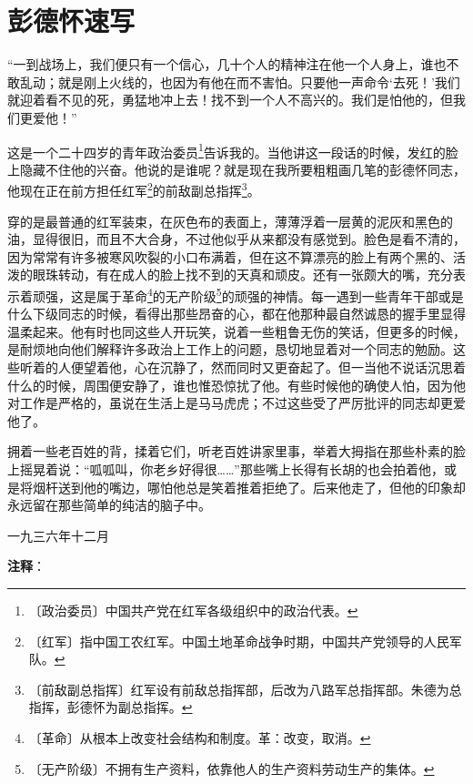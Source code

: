 \documentclass[12pt,UTF-8,openany]{ctexbook}
\begin{document}
\chapter{彭德怀速写}

\begin{Large}
    
    “一到战场上，我们便只有一个信心，几十个人的精神注在他一个人身上，谁也不敢乱动；就是刚上火线的，也因为有他在而不害怕。只要他一声命令‘去死！’我们就迎着看不见的死，勇猛地冲上去！找不到一个人不高兴的。我们是怕他的，但我们更爱他！”
    
    这是一个二十四岁的青年政治委员\footnote{〔政治委员〕中国共产党在红军各级组织中的政治代表。}告诉我的。当他讲这一段话的时候，发红的脸上隐藏不住他的兴奋。他说的是谁呢？就是现在我所要粗粗画几笔的彭德怀同志，他现在正在前方担任红军\footnote{〔红军〕指中国工农红军。中国土地革命战争时期，中国共产党领导的人民军队。}的前敌副总指挥\footnote{〔前敌副总指挥〕红军设有前敌总指挥部，后改为八路军总指挥部。朱德为总指挥，彭德怀为副总指挥。}。
    
    穿的是最普通的红军装束，在灰色布的表面上，薄薄浮着一层黄的泥灰和黑色的油，显得很旧，而且不大合身，不过他似乎从来都没有感觉到。脸色是看不清的，因为常常有许多被寒风吹裂的小口布满着，但在这不算漂亮的脸上有两个黑的、活泼的眼珠转动，有在成人的脸上找不到的天真和顽皮。还有一张颇大的嘴，充分表示着顽强，这是属于革命\footnote{〔革命〕从根本上改变社会结构和制度。革：改变，取消。}的无产阶级\footnote{〔无产阶级〕不拥有生产资料，依靠他人的生产资料劳动生产的集体。}的顽强的神情。每一遇到一些青年干部或是什么下级同志的时候，看得出那些昂奋的心，都在他那种最自然诚恳的握手里显得温柔起来。他有时也同这些人开玩笑，说着一些粗鲁无伤的笑话，但更多的时候，是耐烦地向他们解释许多政治上工作上的问题，恳切地显着对一个同志的勉励。这些听着的人便望着他，心在沉静了，然而同时又更奋起了。但一当他不说话沉思着什么的时候，周围便安静了，谁也惟恐惊扰了他。有些时候他的确使人怕，因为他对工作是严格的，虽说在生活上是马马虎虎；不过这些受了严厉批评的同志却更爱他了。
    
    拥着一些老百姓的背，揉着它们，听老百姓讲家里事，举着大拇指在那些朴素的脸上摇晃着说：“呱呱叫，你老乡好得很……”那些嘴上长得有长胡的也会拍着他，或是将烟杆送到他的嘴边，哪怕他总是笑着推着拒绝了。后来他走了，但他的印象却永远留在那些简单的纯洁的脑子中。
    
    \hfill 一九三六年十二月
    
\end{Large}


\newpage

\textbf{注释}：
\end{document}
